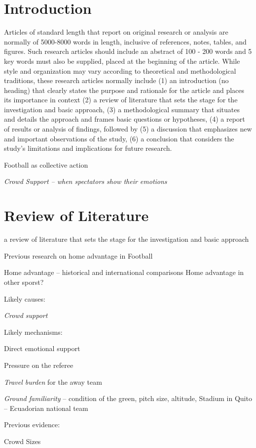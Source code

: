 \documentclass[Afour,sageh,times]{sagej}
\begin{document}
\section{Introduction}
Articles of standard length that report on original research or analysis are normally of 5000-8000 words in length, inclusive of references, notes, tables, and figures. Such research articles should include an abstract of 100 - 200 words and 5 key words must also be supplied, placed at the beginning of the article. While style and organization may vary according to theoretical and methodological traditions, these research articles normally include (1) an introduction (no heading) that clearly states the purpose and rationale for the article and places its importance in context (2) a review of literature that sets the stage for the investigation and basic approach, (3) a methodological summary that situates and details the approach and frames basic questions or hypotheses, (4) a report of results or analysis of findings, followed by (5) a discussion that emphasizes new and important observations of the study, (6) a conclusion that considers the study’s limitations and implications for future research.


{Football as collective action}

\textit{Crowd Support – when spectators show their emotions}

\section{Review of Literature} 
a review of literature that sets the stage for the investigation and basic approach

Previous research on home advantage in Football

Home advantage – historical and international comparisons
Home advantage in other sporst?

Likely causes: 

\textit{Crowd support}

Likely mechanisms:

Direct emotional support

Pressure on the referee

\textit{Travel burden} for the away team

\textit{Ground familiarity}  – condition of the green, pitch size, altitude, 
Stadium in Quito – Ecuadorian national team

Previous evidence: 

Crowd Sizes
\end{document}
